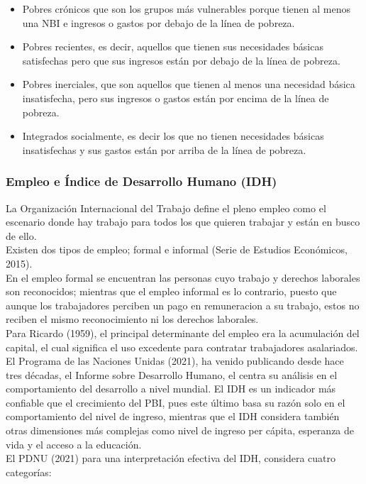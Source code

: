 \begin{itemize}
\item Pobres crónicos que son los grupos más vulnerables porque tienen al menos una NBI e ingresos o gastos por debajo de la línea de pobreza. 
\item Pobres recientes, es decir, aquellos que tienen sus necesidades básicas satisfechas pero que sus ingresos están por debajo de la línea de pobreza. 
\item Pobres inerciales, que son aquellos que tienen al menos una necesidad básica insatisfecha, pero sus ingresos o gastos están por encima de la línea de pobreza.
\item Integrados socialmente, es decir los que no tienen necesidades básicas insatisfechas y sus gastos están por arriba de la línea de pobreza.

\end{itemize}

  \subsubsection{Empleo e Índice de Desarrollo Humano (IDH)}
La Organización Internacional del Trabajo define el pleno empleo como el escenario donde hay trabajo para todos los que quieren trabajar y están en busco de ello. \\
Existen dos tipos de empleo; formal e informal (Serie de Estudios Económicos, 2015).\\
En el empleo formal se encuentran las personas cuyo trabajo y derechos laborales son reconocidos; mientras que el empleo informal es lo contrario, puesto que aunque los trabajadores perciben un pago en remuneracion a su trabajo, estos no reciben el mismo reconocimiento ni los derechos laborales.\\
Para Ricardo (1959), el principal determinante del empleo era la acumulación del capital, el cual significa el uso excedente para contratar trabajadores asalariados.\\
El Programa de las Naciones Unidas (2021), ha venido publicando desde hace tres décadas, el Informe sobre Desarrollo Humano, el centra su análisis en el comportamiento del desarrollo a nivel mundial. El IDH es un indicador más confiable que el crecimiento del PBI, pues este último basa su razón solo en el comportamiento del nivel de ingreso, mientras que el IDH considera también otras dimensiones más complejas como nivel de ingreso per cápita, esperanza de vida y el acceso a la educación. \\
El PDNU (2021) para una interpretación efectiva del IDH, considera cuatro categorías: 

